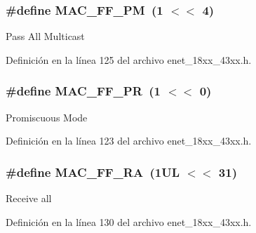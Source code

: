 \subsubsection[{\texorpdfstring{M\+A\+C\+\_\+\+F\+F\+\_\+\+PM}{MAC_FF_PM}}]{\setlength{\rightskip}{0pt plus 5cm}\#define M\+A\+C\+\_\+\+F\+F\+\_\+\+PM~(1 $<$$<$ 4)}\hypertarget{group___e_n_e_t__18_x_x__43_x_x_ga476312e8d0573903322dd01ec3e3488c}{}\label{group___e_n_e_t__18_x_x__43_x_x_ga476312e8d0573903322dd01ec3e3488c}
Pass All Multicast 

Definición en la línea 125 del archivo enet\+\_\+18xx\+\_\+43xx.\+h.

\subsubsection[{\texorpdfstring{M\+A\+C\+\_\+\+F\+F\+\_\+\+PR}{MAC_FF_PR}}]{\setlength{\rightskip}{0pt plus 5cm}\#define M\+A\+C\+\_\+\+F\+F\+\_\+\+PR~(1 $<$$<$ 0)}\hypertarget{group___e_n_e_t__18_x_x__43_x_x_gaec8d4f42f09b9f0308843993cff7caf3}{}\label{group___e_n_e_t__18_x_x__43_x_x_gaec8d4f42f09b9f0308843993cff7caf3}
Promiscuous Mode 

Definición en la línea 123 del archivo enet\+\_\+18xx\+\_\+43xx.\+h.

\subsubsection[{\texorpdfstring{M\+A\+C\+\_\+\+F\+F\+\_\+\+RA}{MAC_FF_RA}}]{\setlength{\rightskip}{0pt plus 5cm}\#define M\+A\+C\+\_\+\+F\+F\+\_\+\+RA~(1\+U\+L $<$$<$ 31)}\hypertarget{group___e_n_e_t__18_x_x__43_x_x_ga800b6d9dc0edb2df4997cdec13abd6b6}{}\label{group___e_n_e_t__18_x_x__43_x_x_ga800b6d9dc0edb2df4997cdec13abd6b6}
Receive all 

Definición en la línea 130 del archivo enet\+\_\+18xx\+\_\+43xx.\+h.

